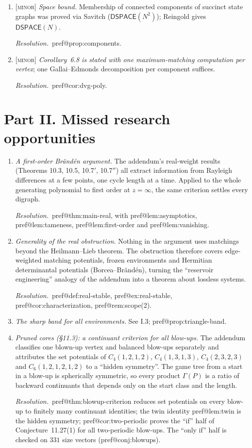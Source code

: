 \documentclass[11pt]{amsart}
\makeatletter
\newcommand{\pref}[1]{\csname pref@#1\endcsname}
\newcommand{\sev}[1]{\textsc{[#1]}}
\newcommand{\fix}{\par\noindent\emph{Resolution.}\ }
\makeatother
\begin{document}
\begin{enumerate}[label=\textbf{I.\arabic*},leftmargin=*,widest=I.22]
\item \sev{minor} \emph{Space bound.} Membership of connected components of succinct state graphs was proved via Savitch ($\mathsf{DSPACE}(N^2)$); Reingold gives $\mathsf{DSPACE}(N)$.
\fix \pref{prop:components}.

\item \sev{minor} \emph{Corollary~6.8 is stated with one maximum-matching computation per vertex}; one Gallai--Edmonds decomposition per component suffices.
\fix \pref{cor:dvg-poly}.
\end{enumerate}

\section*{Part II. Missed research opportunities}

\begin{enumerate}[label=\textbf{II.\arabic*},leftmargin=*,widest=II.8]
\item \emph{A first-order Br\"and\'en argument.} The addendum's real-weight results (Theorems 10.3, 10.5, 10.7$'$, 10.7$''$) all extract information from Rayleigh differences at a few points, one cycle length at a time. Applied to the whole generating polynomial to first order at $z=\infty$, the same criterion settles every digraph.
\fix \pref{thm:main-real}, with \pref{lem:asymptotics}, \pref{lem:tameness}, \pref{lem:first-order} and \pref{lem:vanishing}.

\item \emph{Generality of the real obstruction.} Nothing in the argument uses matchings beyond the Heilmann--Lieb theorem. The obstruction therefore covers edge-weighted matching potentials, frozen environments and Hermitian determinantal potentials (Borcea--Br\"and\'en), turning the ``reservoir engineering'' analogy of the addendum into a theorem about lossless systems.
\fix \pref{def:real-stable}, \pref{ex:real-stable}, \pref{cor:characterization}, \pref{rem:scope}(2).

\item \emph{The sharp band for all environments.} See I.3; \pref{prop:triangle-band}.

\item \emph{Pruned cores (\S11.3): a continuant criterion for all blow-ups.} The addendum classifies one blown-up vertex and balanced blow-ups separately and attributes the set potentials of $C_4(1,2,1,2)$, $C_4(1,3,1,3)$, $C_4(2,3,2,3)$ and $C_6(1,2,1,2,1,2)$ to a ``hidden symmetry''. The game tree from a start in a blow-up is spherically symmetric, so every product $\Gamma(P)$ is a ratio of backward continuants that depends only on the start class and the length.
\fix \pref{thm:blowup-criterion} reduces set potentials on every blow-up to finitely many continuant identities; the twin identity \pref{lem:twin} is the hidden symmetry; \pref{cor:two-periodic} proves the ``if'' half of Conjecture~11.27(1) for all two-periodic blow-ups. The ``only if'' half is checked on $331$ size vectors (\pref{conj:blowups}).


\end{enumerate}
\end{document}
